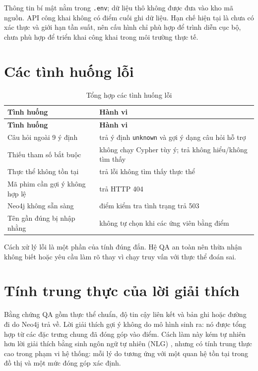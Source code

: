 Thông tin bí mật nằm trong \texttt{.env}; dữ liệu thô không được đưa vào kho mã
nguồn. API công khai không có điểm cuối ghi dữ liệu. Hạn chế hiện tại là chưa có
xác thực và giới hạn tần suất, nên cấu hình chỉ phù hợp để trình diễn cục bộ,
chưa phù hợp để triển khai công khai trong môi trường thực tế.

\section{Các tình huống lỗi}

\begin{longtable}{|>{\raggedright\arraybackslash}p{}|>{\raggedright\arraybackslash}p{}|}
\caption{Tổng hợp các tình huống lỗi}\label{tab:6-4} \\
\hline
\textbf{Tình huống} & \textbf{Hành vi} \\ \hline
\endfirsthead\hline \textbf{Tình huống} & \textbf{Hành vi} \\ \hline\endhead
Câu hỏi ngoài 9 ý định & trả ý định \texttt{unknown} và gợi ý dạng câu hỏi hỗ trợ \\ \hline
Thiếu tham số bắt buộc & không chạy Cypher tùy ý; trả không hiểu/không tìm thấy \\ \hline
Thực thể không tồn tại & trả lỗi không tìm thấy thực thể \\ \hline
Mã phim cần gợi ý không hợp lệ & trả HTTP 404 \\ \hline
Neo4j không sẵn sàng & điểm kiểm tra tình trạng trả 503 \\ \hline
Tên gần đúng bị nhập nhằng & không tự chọn khi các ứng viên bằng điểm \\ \hline
\end{longtable}

Cách xử lý lỗi là một phần của tính đúng đắn. Hệ QA an toàn nên thừa nhận không
biết hoặc yêu cầu làm rõ thay vì chạy truy vấn với thực thể đoán sai.

\section{Tính trung thực của lời giải thích}

Bằng chứng QA gồm thực thể chuẩn, độ tin cậy liên kết và bản ghi hoặc đường đi do
Neo4j trả về. Lời giải thích gợi ý không do mô hình sinh ra: nó được tổng hợp từ
các đặc trưng chung đã đóng góp vào điểm. Cách làm này kém tự nhiên hơn lời giải
thích bằng sinh ngôn ngữ tự nhiên (NLG) \cite{colas2023knowledge}, nhưng có tính
trung thực cao trong phạm vi hệ thống: mỗi lý do tương ứng với một quan hệ tồn
tại trong đồ thị và một mức đóng góp xác định.
